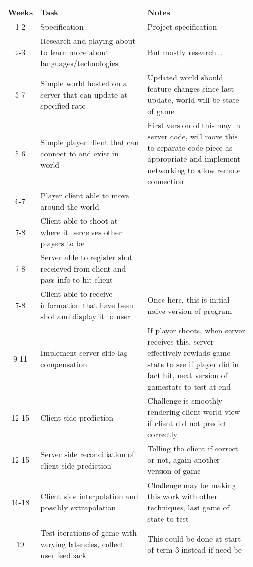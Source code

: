 \documentclass{article}
\begin{document}
	\begin{longtable}{|c p{5.5cm} p{8cm}|}
		\hline
		Weeks & Task & Notes \\
		\hline\hline\endhead %
		
		1-2 & Specification & Project specification \\
		\hline
		2-3 & Research and playing about to learn more about languages/technologies & But mostly research... \\
		\hline

		3-7 & Simple world hosted on a server that can update at specified rate & Updated world should feature changes since last update, world will be state of game \\
		\hline
		5-6 & Simple player client that can connect to and exist in world & First version of this may in server code, will move this to separate code piece as appropriate and implement networking to allow remote connection \\
		\hline
		6-7 & Player client able to move around the world & \\
		\hline

		7-8 & Client able to shoot at where it perceives other players to be & \\
		\hline
		7-8 & Server able to register shot receieved from client and pass info to hit client & \\
		\hline
		7-8 & Client able to receive information that have been shot and display it to user & Once here, this is initial naive version of program \\
		\hline

		9-11 & Implement server-side lag compensation & If player shoots, when server receives this, server effectively rewinds game-state to see if player did in fact hit, next version of gamestate to test at end \\
		\hline\hline

		12-15 & Client side prediction & Challenge is smoothly rendering client world view if client did not predict correctly \\
		\hline
		12-15 & Server side reconciliation of client side prediction & Telling the client if correct or not, again another version of game \\
		\hline

		16-18 & Client side interpolation and possibly extrapolation & Challenge may be making this work with other techniques, last game of state to test \\
		\hline
		
		19 & Test iterations of game with varying latencies, collect user feedback & This could be done at start of term 3 instead if need be \\
		\hline
		
	\end{longtable}
\end{document}
